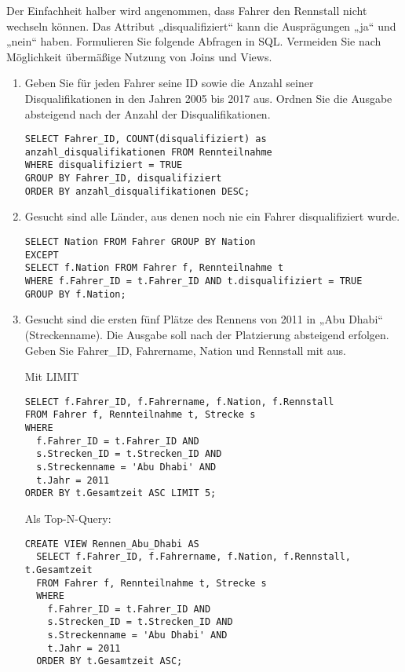 \documentclass{bschlangaul-aufgabe}
\begin{document}
\noindent
Der Einfachheit halber wird angenommen, dass Fahrer den Rennstall nicht
wechseln können. Das Attribut „disqualifiziert“ kann die Ausprägungen
„ja“ und „nein“ haben. Formulieren Sie folgende Abfragen in SQL.
Vermeiden Sie nach Möglichkeit übermäßige Nutzung von Joins und Views.

\begin{enumerate}
\item Geben Sie für jeden Fahrer seine ID sowie die Anzahl seiner
Disqualifikationen in den Jahren 2005 bis 2017 aus. Ordnen Sie die
Ausgabe absteigend nach der Anzahl der Disqualifikationen.

\begin{bAntwort}
\begin{verbatim}
SELECT Fahrer_ID, COUNT(disqualifiziert) as anzahl_disqualifikationen FROM Rennteilnahme
WHERE disqualifiziert = TRUE
GROUP BY Fahrer_ID, disqualifiziert
ORDER BY anzahl_disqualifikationen DESC;
\end{verbatim}
\end{bAntwort}

\item Gesucht sind alle Länder, aus denen noch nie ein Fahrer
disqualifiziert wurde.

\begin{bAntwort}
\begin{verbatim}
SELECT Nation FROM Fahrer GROUP BY Nation
EXCEPT
SELECT f.Nation FROM Fahrer f, Rennteilnahme t
WHERE f.Fahrer_ID = t.Fahrer_ID AND t.disqualifiziert = TRUE
GROUP BY f.Nation;
\end{verbatim}
\end{bAntwort}

\item Gesucht sind die ersten fünf Plätze des Rennens von 2011 in „Abu
Dhabi“ (Streckenname). Die Ausgabe soll nach der Platzierung absteigend
erfolgen. Geben Sie Fahrer\_ID, Fahrername, Nation und Rennstall mit
aus.

\begin{bAntwort}
Mit LIMIT
\begin{verbatim}
SELECT f.Fahrer_ID, f.Fahrername, f.Nation, f.Rennstall
FROM Fahrer f, Rennteilnahme t, Strecke s
WHERE
  f.Fahrer_ID = t.Fahrer_ID AND
  s.Strecken_ID = t.Strecken_ID AND
  s.Streckenname = 'Abu Dhabi' AND
  t.Jahr = 2011
ORDER BY t.Gesamtzeit ASC LIMIT 5;
\end{verbatim}

Als Top-N-Query:

\begin{verbatim}
CREATE VIEW Rennen_Abu_Dhabi AS
  SELECT f.Fahrer_ID, f.Fahrername, f.Nation, f.Rennstall, t.Gesamtzeit
  FROM Fahrer f, Rennteilnahme t, Strecke s
  WHERE
    f.Fahrer_ID = t.Fahrer_ID AND
    s.Strecken_ID = t.Strecken_ID AND
    s.Streckenname = 'Abu Dhabi' AND
    t.Jahr = 2011
  ORDER BY t.Gesamtzeit ASC;


\end{verbatim}
\end{bAntwort}
\end{enumerate}
\end{document}
